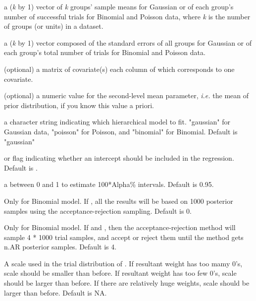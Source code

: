 \documentclass[a4paper]{book}
\begin{document}
\begin{Arguments}
\begin{ldescription}
\item[\code{x}] 
a (\emph{k} by 1) vector of \emph{k} groups' sample means for Gaussian or of each group's number of successful trials for Binomial and Poisson data, where \emph{k} is the number of groups (or units) in a dataset.

\item[\code{w}] 
a (\emph{k} by 1) vector composed of the standard errors of all groups for Gaussian or 
of each group's total number of trials for Binomial and Poisson data.

\item[\code{covariates}] 
(optional) a matrix of covariate(s) each column of which corresponds to one covariate.

\item[\code{mean.PriorDist}] 
(optional) a numeric value for the second-level mean parameter, \emph{i.e.} the mean of prior
distribution, if you know this value a priori.

\item[\code{model}] 
a character string indicating which hierarchical model to fit. "gaussian" for Gaussian data, 
"poisson" for Poisson, and "binomial" for Binomial. Default is "gaussian"

\item[\code{intercept}] 
 or  flag indicating whether an intercept should be
included in the regression. Default is .

\item[\code{Alpha}] 
a  between 0 and 1 to estimate 100*Alpha\% intervals. Default is 0.95.


\item[\code{n.AR}] 
Only for Binomial model. If , all the results will be based on 1000 posterior samples using the acceptance-rejection sampling. Default is 0.

\item[\code{n.AR.factor}] 
Only for Binomial model. If  and , then the acceptance-rejection method will sample 4 * 1000 trial samples, and accept or reject them until the method gets n.AR posterior samples. Default is 4.


\item[\code{trial.scale}] 
A scale used in the trial distribution of \eqn{\alpha}{}. If resultant weight has too mamy 0's, scale should be smaller than before. If resultant weight has too few 0's, scale should be larger than before. If there are relatively huge weights, scale should be larger than before. Default is NA.



\end{ldescription}
\end{Arguments}
\end{document}
